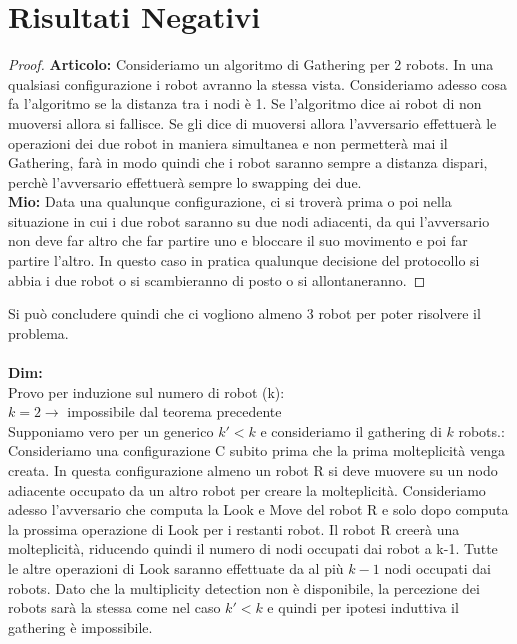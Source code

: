 \section{Risultati Negativi}
\begin{proof}
\textbf{Articolo:} Consideriamo un algoritmo di Gathering per 2 robots. In una qualsiasi configurazione i robot avranno la stessa vista. Consideriamo adesso cosa fa l'algoritmo se la distanza tra i nodi è 1. Se l'algoritmo dice ai robot di non muoversi allora si fallisce. Se gli dice di muoversi allora l'avversario effettuerà le operazioni dei due robot in maniera simultanea e non permetterà mai il Gathering, farà in modo quindi che i robot saranno sempre a distanza dispari, perchè l'avversario effettuerà sempre lo swapping dei due.\\
\textbf{Mio:} Data una qualunque configurazione, ci si troverà prima o poi nella situazione in cui i due robot saranno su due nodi adiacenti, da qui l'avversario non deve far altro che far partire uno e bloccare il suo movimento e poi far partire l'altro. In questo caso in pratica qualunque decisione del protocollo si abbia i due robot o si scambieranno di posto o si allontaneranno.
\end{proof}
Si può concludere quindi che ci vogliono almeno 3 robot per poter risolvere il problema.\\
\\
\textbf{Dim:}\\
Provo per induzione sul numero di robot (k):\\
$k = 2 \rightarrow $ impossibile dal teorema precedente\\
Supponiamo vero per un generico $k'< k$ e consideriamo il gathering di $k$ robots.:\\
Consideriamo una configurazione C subito prima che la prima molteplicità venga creata. In questa configurazione almeno un robot R si deve muovere su un nodo adiacente occupato da un altro robot per creare la molteplicità. Consideriamo adesso l'avversario che computa la Look e Move del robot R e solo dopo computa la prossima operazione di Look per i restanti robot. Il robot R creerà una molteplicità, riducendo quindi il numero di nodi occupati dai robot a k-1. Tutte le altre operazioni di Look saranno effettuate da al più $k-1$ nodi occupati dai robots. Dato che la multiplicity detection non è disponibile, la percezione dei robots sarà la stessa come nel caso $k'<k$ e quindi per ipotesi induttiva il gathering è impossibile.

